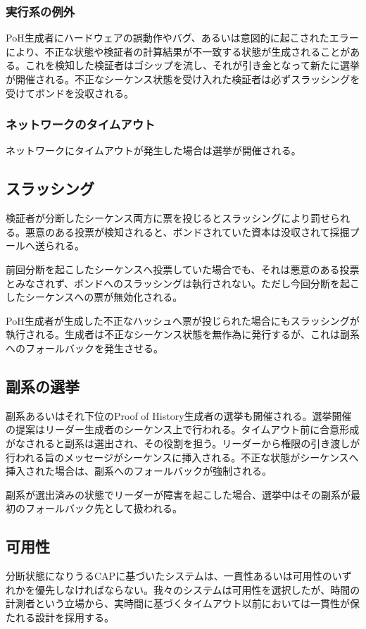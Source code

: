 \documentclass[12pt]{ltjsarticle}
\begin{document}
\subsubsection{実行系の例外}
PoH生成者にハードウェアの誤動作やバグ、あるいは意図的に起こされたエラーにより、不正な状態や検証者の計算結果が不一致する状態が生成されることがある。これを検知した検証者はゴシップを流し、それが引き金となって新たに選挙が開催される。不正なシーケンス状態を受け入れた検証者は必ずスラッシングを受けてボンドを没収される。

\subsubsection{ネットワークのタイムアウト}

ネットワークにタイムアウトが発生した場合は選挙が開催される。

\subsection{スラッシング}
検証者が分断したシーケンス両方に票を投じるとスラッシングにより罰せられる。悪意のある投票が検知されると、ボンドされていた資本は没収されて採掘プールへ送られる。

前回分断を起こしたシーケンスへ投票していた場合でも、それは悪意のある投票とみなされず、ボンドへのスラッシングは執行されない。ただし今回分断を起こしたシーケンスへの票が無効化される。

PoH生成者が生成した不正なハッシュへ票が投じられた場合にもスラッシングが執行される。生成者は不正なシーケンス状態を無作為に発行するが、これは副系へのフォールバックを発生させる。

\subsection{副系の選挙}
副系あるいはそれ下位のProof of History生成者の選挙も開催される。選挙開催の提案はリーダー生成者のシーケンス上で行われる。タイムアウト前に合意形成がなされると副系は選出され、その役割を担う。リーダーから権限の引き渡しが行われる旨のメッセージがシーケンスに挿入される。不正な状態がシーケンスへ挿入された場合は、副系へのフォールバックが強制される。

副系が選出済みの状態でリーダーが障害を起こした場合、選挙中はその副系が最初のフォールバック先として扱われる。

\subsection{可用性}\label{availability}
分断状態になりうるCAPに基づいたシステムは、一貫性あるいは可用性のいずれかを優先しなければならない。我々のシステムは可用性を選択したが、時間の計測者という立場から、実時間に基づくタイムアウト以前においては一貫性が保たれる設計を採用する。
\end{document}
